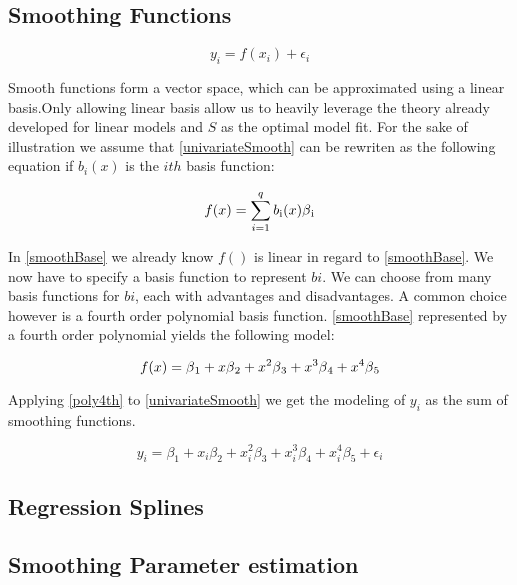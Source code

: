 \documentclass{article}
\begin{document}
    \subsection{Smoothing Functions}
     \begin{equation} \label{univariateSmooth} y_i = f(x_i) + \epsilon_i \end{equation}

     Smooth functions form a vector space, which can be approximated using a linear basis.Only allowing linear basis allow us to heavily leverage the theory already developed for linear models and $S$ as the optimal model fit. For the sake of illustration we assume that \ref{univariateSmooth} can be rewriten as the following equation if $b_i(x)$ is the $ith$ basis function:

    \begin{equation} \label{smoothBase} f(x) = \sum_{i=1}^{q} b\textsubscript{i} (x) \beta \textsubscript{i} \end{equation}

    In \ref{smoothBase} we already know $f()$ is linear in regard to \ref{smoothBase}. We now have to specify a basis function to represent $bi$. We can choose from many basis functions for $bi$, each with advantages and disadvantages. A common choice however is a fourth order polynomial basis function. \ref{smoothBase} represented by a fourth order polynomial yields the following model:

    \begin{equation} \label{poly4th} f(x) = \beta \textsubscript{1} + x\beta \textsubscript{2} + x^2\beta \textsubscript{3} + x^3\beta \textsubscript{4} + x^4\beta \textsubscript{5}  \end{equation}

    Applying \ref{poly4th} to \ref{univariateSmooth} we get the modeling of $y_i$ as the sum of smoothing functions.

    \begin{equation} \label{poly4thGAM}  y_i = \beta_1 + x_i\beta_2 + x_i^2\beta_3+ x_i^3\beta_4 + x_i^4\beta_5 + \epsilon_i \end{equation}
    \subsection{Regression Splines}
    \subsection{Smoothing Parameter estimation}
\end{document}
